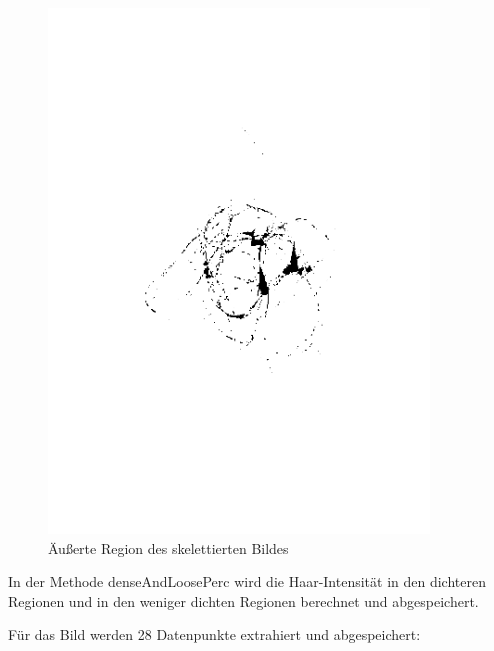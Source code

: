 \documentclass[german,a4paper,12pt]{llncs}
\begin{document}
\begin{figure}
	\centering
	\includegraphics[width=0.9\textwidth]{fig64/09outer section.png}
	\caption[]{Äußerte Region des skelettierten Bildes}
	\label{img:skel}
\end{figure}

In der Methode denseAndLoosePerc wird die Haar-Intensität in den dichteren Regionen und in den weniger dichten Regionen berechnet und abgespeichert.

Für das Bild werden 28 Datenpunkte extrahiert und abgespeichert: 
\end{document}
